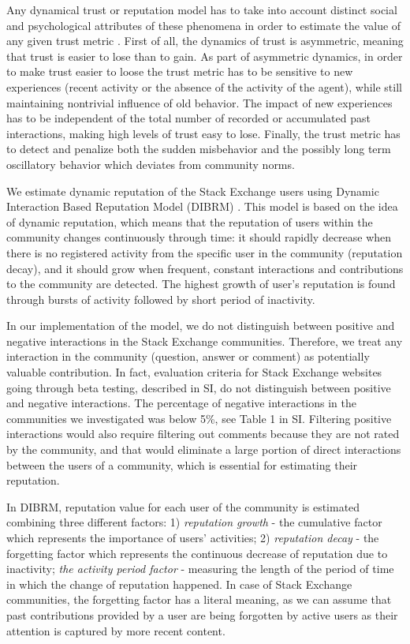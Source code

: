 Any dynamical trust or reputation model has to take into account distinct social and psychological attributes of these phenomena in order to estimate the value of any given trust metric \cite{duma2005dynamic}. First of all, the dynamics of trust is asymmetric, meaning that trust is easier to lose than to gain. As part of asymmetric dynamics, in order to make trust easier to loose the trust metric has to be sensitive to new experiences (recent activity or the absence of the activity of the agent), while still maintaining nontrivial influence of old behavior. The impact of new experiences has to be independent of
the total number of recorded or accumulated past interactions, making high levels of trust easy to lose. 
Finally, the trust metric has to detect and penalize both the sudden misbehavior and the possibly long term oscillatory behavior which deviates from community norms.

We estimate dynamic reputation of the Stack Exchange users using Dynamic Interaction Based Reputation Model (DIBRM) \cite{melnikovDynamicInteractionBasedReputation2018}. This model is based on the idea of dynamic reputation, which means that the reputation of users within the community changes continuously through time: it should rapidly decrease when there is no registered activity from the specific user in the community (reputation decay), and it should grow when frequent, constant interactions
and contributions to the community are detected. The highest growth of user's reputation is found through bursts of activity followed by short period of inactivity. 

In our implementation of the model, we do not distinguish between positive and negative interactions in the Stack Exchange communities. Therefore, we treat any interaction in the community (question, answer or comment) as potentially valuable contribution. In fact, evaluation criteria for Stack Exchange websites going through beta testing, described in SI, do not distinguish between positive and negative interactions.
The percentage of negative interactions in the communities we investigated was below 5\%, see Table 1 in SI. Filtering positive interactions would also require filtering out comments because they are not rated by the community, and that would eliminate a large portion of
direct interactions between the users of a community, which is essential for estimating their reputation.

In DIBRM, reputation value for each user of the community is estimated combining three different factors: 1) \textit{reputation growth} - the cumulative factor which represents the importance of users' activities; 2) \textit{reputation decay} - the forgetting factor which represents the continuous decrease of reputation due to inactivity; \textit{the activity period factor} - measuring the length of the period of time in which the change of reputation happened. In case of Stack Exchange communities, the forgetting factor has a literal meaning, as we can assume that past contributions provided by a user are being forgotten by active users as their attention is captured by more recent content.

